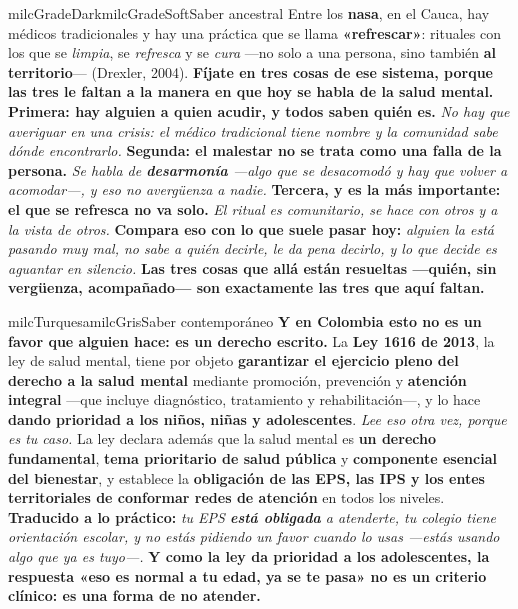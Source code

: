 \documentclass[11pt,letterpaper]{article}
\begin{document}
\begin{softbox}{milcGradeDark}{milcGradeSoft}{Saber ancestral}
Entre los \textbf{nasa}, en el Cauca, hay médicos tradicionales y hay una práctica que se llama \textbf{«refrescar»}: rituales con los que se \emph{limpia}, se \emph{refresca} y se \emph{cura} ---no solo a una persona, sino también \textbf{al territorio}--- (Drexler, 2004). \textbf{Fíjate en tres cosas de ese sistema, porque las tres le faltan a la manera en que hoy se habla de la salud mental.} \textbf{Primera: hay alguien a quien acudir, y todos saben quién es.} \emph{No hay que averiguar en una crisis: el médico tradicional tiene nombre y la comunidad sabe dónde encontrarlo.} \textbf{Segunda: el malestar no se trata como una falla de la persona.} \emph{Se habla de \textbf{desarmonía} ---algo que se desacomodó y hay que volver a acomodar---, y eso no avergüenza a nadie.} \textbf{Tercera, y es la más importante: el que se refresca no va solo.} \emph{El ritual es comunitario, se hace con otros y a la vista de otros.} \textbf{Compara eso con lo que suele pasar hoy:} \emph{alguien la está pasando muy mal, no sabe a quién decirle, le da pena decirlo, y lo que decide es aguantar en silencio.} \textbf{Las tres cosas que allá están resueltas ---quién, sin vergüenza, acompañado--- son exactamente las tres que aquí faltan.}
\end{softbox}

\begin{softbox}{milcTurquesa}{milcGris}{Saber contemporáneo}
\textbf{Y en Colombia esto no es un favor que alguien hace: es un derecho escrito.} La \textbf{Ley 1616 de 2013}, la ley de salud mental, tiene por objeto \textbf{garantizar el ejercicio pleno del derecho a la salud mental} mediante promoción, prevención y \textbf{atención integral} ---que incluye diagnóstico, tratamiento y rehabilitación---, y lo hace \textbf{dando prioridad a los niños, niñas y adolescentes}. \emph{Lee eso otra vez, porque es tu caso.} La ley declara además que la salud mental es \textbf{un derecho fundamental}, \textbf{tema prioritario de salud pública} y \textbf{componente esencial del bienestar}, y establece la \textbf{obligación de las EPS, las IPS y los entes territoriales de conformar redes de atención} en todos los niveles. \textbf{Traducido a lo práctico:} \emph{tu EPS \textbf{está obligada} a atenderte, tu colegio tiene orientación escolar, y no estás pidiendo un favor cuando lo usas ---estás usando algo que ya es tuyo---.} \textbf{Y como la ley da prioridad a los adolescentes, la respuesta «eso es normal a tu edad, ya se te pasa» no es un criterio clínico: es una forma de no atender.}
\end{softbox}
\end{document}
